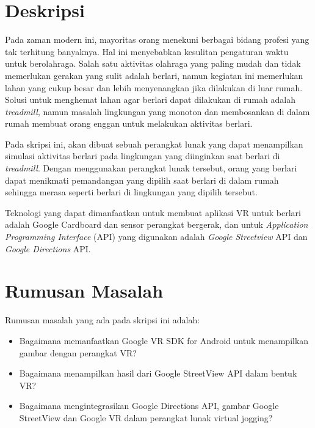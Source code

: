 \documentclass[a4paper,twoside]{article}
\begin{document}
\title{\@judultopik}
\author{\nama \textendash \@npm} 

\newcommand{\nama}{Richard Wijaya}
\newcommand{\@npm}{2016730014}
\newcommand{\@judultopik}{Virtual Jogging App untuk Google Cardboard} %
\newcommand{\jumpemb}{1} %
\newcommand{\tanggal}{06/02/2020}


\maketitle


\section{Deskripsi}
Pada zaman modern ini, mayoritas orang menekuni berbagai bidang profesi yang tak terhitung banyaknya. Hal ini menyebabkan kesulitan pengaturan waktu untuk berolahraga. Salah satu aktivitas olahraga yang paling mudah dan tidak memerlukan gerakan yang sulit adalah berlari, namun kegiatan ini memerlukan lahan yang cukup besar dan lebih menyenangkan jika dilakukan di luar rumah. Solusi untuk menghemat lahan agar berlari dapat dilakukan di rumah adalah {\it treadmill}, namun masalah lingkungan yang monoton dan membosankan di dalam rumah membuat orang enggan untuk melakukan aktivitas berlari. 

Pada skripsi ini, akan dibuat sebuah perangkat lunak yang dapat menampilkan simulasi aktivitas berlari pada lingkungan yang diinginkan saat berlari di {\it treadmill}. Dengan menggunakan perangkat lunak tersebut, orang yang berlari dapat menikmati pemandangan yang dipilih saat berlari di dalam rumah sehingga merasa seperti berlari di lingkungan yang dipilih tersebut.

Teknologi yang dapat dimanfaatkan untuk membuat aplikasi VR untuk berlari adalah Google Cardboard dan sensor perangkat bergerak, dan untuk {\it Application Programming Interface} (API) yang digunakan adalah {\it Google Streetview} API dan {\it Google Directions} API.

\section{Rumusan Masalah}
Rumusan masalah yang ada pada skripsi ini adalah:
\begin{itemize}
	\item Bagaimana memanfaatkan Google VR SDK for Android untuk menampilkan gambar dengan perangkat VR?
	\item Bagaimana menampilkan hasil dari Google StreetView API dalam bentuk VR?
	\item Bagaimana mengintegrasikan Google Directions API, gambar Google StreetView dan Google VR dalam perangkat lunak virtual jogging?
\end{itemize}
\end{document}
